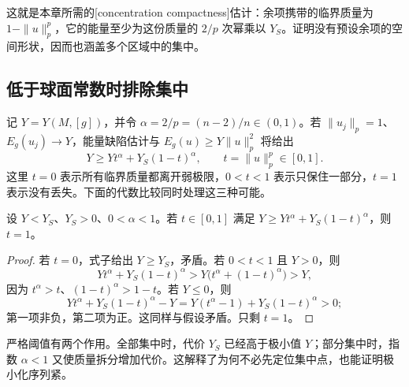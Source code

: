 这就是本章所需的[concentration compactness]估计：余项携带的临界质量为 \(1-\|u\|_p^p\)，它的能量至少为这份质量的 \(2/p\) 次幂乘以 \(Y_S\)。证明没有预设余项的空间形状，因而也涵盖多个区域中的集中。

\subsection{低于球面常数时排除集中}
\label{g3:subsec:2404:03}
记 \(Y=Y(M,[g])\)，并令 \(\alpha=2/p=(n-2)/n\in(0,1)\)。若 \(\|u_j\|_p=1\)、\(E_g(u_j)\to Y\)，能量缺陷估计与 \(E_g(u)\ge Y\|u\|_p^2\) 将给出
\begin{equation}\label{g3:eq:yamabe-mass-comparison}
	Y\ge Yt^\alpha+Y_S(1-t)^\alpha,
	\qquad t=\|u\|_p^p\in[0,1].
\end{equation}
这里 \(t=0\) 表示所有临界质量都离开弱极限，\(0<t<1\) 表示只保住一部分，\(t=1\) 表示没有丢失。下面的代数比较同时处理这三种可能。

\begin{lemma}\label{g3:lem:yamabe-threshold-exclusion}
	设 \(Y<Y_S\)、\(Y_S>0\)、\(0<\alpha<1\)。若 \(t\in[0,1]\) 满足 \(Y\ge Yt^\alpha+Y_S(1-t)^\alpha\)，则 \(t=1\)。
\end{lemma}
\begin{proof}
	若 \(t=0\)，式子给出 \(Y\ge Y_S\)，矛盾。若 \(0<t<1\) 且 \(Y>0\)，则
	\[
		Yt^\alpha+Y_S(1-t)^\alpha
		>Y\bigl(t^\alpha+(1-t)^\alpha\bigr)>Y,
	\]
	因为 \(t^\alpha>t\)、\((1-t)^\alpha>1-t\)。若 \(Y\le0\)，则
	\[
		Yt^\alpha+Y_S(1-t)^\alpha-Y
		=Y(t^\alpha-1)+Y_S(1-t)^\alpha>0;
	\]
	第一项非负，第二项为正。这同样与假设矛盾。只剩 \(t=1\)。
\end{proof}

严格阈值有两个作用。全部集中时，代价 \(Y_S\) 已经高于极小值 \(Y\)；部分集中时，指数 \(\alpha<1\) 又使质量拆分增加代价。这解释了为何不必先定位集中点，也能证明极小化序列紧。

